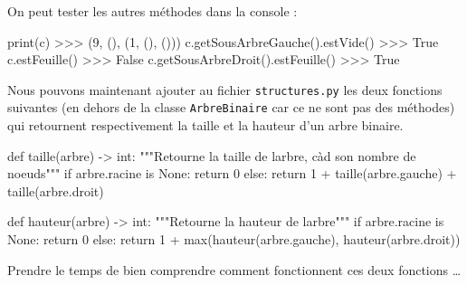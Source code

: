 \documentclass[
  letterpaper,
  DIV=11,
  numbers=noendperiod]{scrartcl}
\newenvironment{Shaded}{\begin{snugshade}}{\end{snugshade}}
\newcommand{\BuiltInTok}[1]{\textcolor[rgb]{0.00,0.23,0.31}{#1}}
\newcommand{\CommentTok}[1]{\textcolor[rgb]{0.37,0.37,0.37}{#1}}
\newcommand{\ControlFlowTok}[1]{\textcolor[rgb]{0.00,0.23,0.31}{#1}}
\newcommand{\DecValTok}[1]{\textcolor[rgb]{0.68,0.00,0.00}{#1}}
\newcommand{\KeywordTok}[1]{\textcolor[rgb]{0.00,0.23,0.31}{#1}}
\newcommand{\NormalTok}[1]{\textcolor[rgb]{0.00,0.23,0.31}{#1}}
\newcommand{\OperatorTok}[1]{\textcolor[rgb]{0.37,0.37,0.37}{#1}}
\newcommand{\VariableTok}[1]{\textcolor[rgb]{0.07,0.07,0.07}{#1}}
\begin{document}
On peut tester les autres méthodes dans la console :

\begin{Shaded}
\begin{Highlighting}[]
\BuiltInTok{print}\NormalTok{(c)}
\OperatorTok{\textgreater{}\textgreater{}\textgreater{}}\NormalTok{ (}\DecValTok{9}\NormalTok{, (), (}\DecValTok{1}\NormalTok{, (), ()))}
\NormalTok{c.getSousArbreGauche().estVide()}
\OperatorTok{\textgreater{}\textgreater{}\textgreater{}} \VariableTok{True}
\NormalTok{c.estFeuille()}
\OperatorTok{\textgreater{}\textgreater{}\textgreater{}} \VariableTok{False}
\NormalTok{c.getSousArbreDroit().estFeuille()}
\OperatorTok{\textgreater{}\textgreater{}\textgreater{}} \VariableTok{True}
\end{Highlighting}
\end{Shaded}

Nous pouvons maintenant ajouter au fichier \texttt{structures.py} les
deux fonctions suivantes (en dehors de la classe \texttt{ArbreBinaire}
car ce ne sont pas des méthodes) qui retournent respectivement la taille
et la hauteur d'un arbre binaire.

\begin{Shaded}
\begin{Highlighting}[]
\KeywordTok{def}\NormalTok{ taille(arbre) }\OperatorTok{{-}\textgreater{}} \BuiltInTok{int}\NormalTok{:}
    \CommentTok{"""Retourne la taille de l\textquotesingle{}arbre, càd son nombre de noeuds"""}
    \ControlFlowTok{if}\NormalTok{ arbre.racine }\KeywordTok{is} \VariableTok{None}\NormalTok{:}
        \ControlFlowTok{return} \DecValTok{0}
    \ControlFlowTok{else}\NormalTok{:}
        \ControlFlowTok{return} \DecValTok{1} \OperatorTok{+}\NormalTok{ taille(arbre.gauche) }\OperatorTok{+}\NormalTok{ taille(arbre.droit)}

\KeywordTok{def}\NormalTok{ hauteur(arbre) }\OperatorTok{{-}\textgreater{}} \BuiltInTok{int}\NormalTok{:}
    \CommentTok{"""Retourne la hauteur de l\textquotesingle{}arbre"""}
    \ControlFlowTok{if}\NormalTok{ arbre.racine }\KeywordTok{is} \VariableTok{None}\NormalTok{:}
        \ControlFlowTok{return} \DecValTok{0}
    \ControlFlowTok{else}\NormalTok{:}
        \ControlFlowTok{return} \DecValTok{1} \OperatorTok{+} \BuiltInTok{max}\NormalTok{(hauteur(arbre.gauche), hauteur(arbre.droit))}
\end{Highlighting}
\end{Shaded}

Prendre le temps de bien comprendre comment fonctionnent ces deux
fonctions \ldots{}
\end{document}
